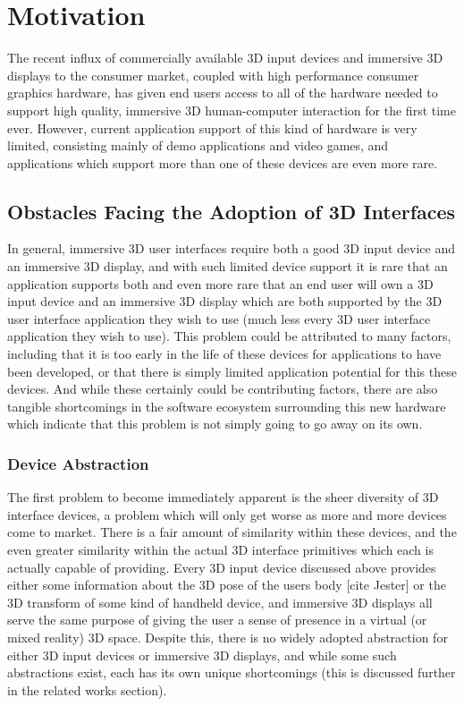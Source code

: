 \chapter{Motivation}
The recent influx of commercially available 3D input devices and immersive 3D displays to the consumer market, coupled with high performance consumer graphics hardware, has given end users access to all of the hardware needed to support high quality, immersive 3D human-computer interaction for the first time ever. However, current application support of this kind of hardware is very limited, consisting mainly of demo applications and video games, and applications which support more than one of these devices are even more rare. 

\section{Obstacles Facing the Adoption of 3D Interfaces}

In general, immersive 3D user interfaces require both a good 3D input device and an immersive 3D display, and with such limited device support it is rare that an application supports both and even more rare that an end user will own a 3D input device and an immersive 3D display which are both supported by the 3D user interface application they wish to use (much less every 3D user interface application they wish to use). This problem could be attributed to many factors, including that it is too early in the life of these devices for applications to have been developed, or that there is simply limited application potential for this these devices. And while these certainly could be contributing factors, there are also tangible shortcomings in the software ecosystem surrounding this new hardware which indicate that this problem is not simply going to go away on its own.

\subsection{Device Abstraction}

The first problem to become immediately apparent is the sheer diversity of 3D interface devices, a problem which will only get worse as more and more devices come to market. There is a fair amount of similarity within these devices, and the even greater similarity within the actual 3D interface primitives which each is actually capable of providing. Every 3D input device discussed above provides either some information about the 3D pose of the users body [cite Jester] or the 3D transform of some kind of handheld device, and immersive 3D displays all serve the same purpose of giving the user a sense of presence in a virtual (or mixed reality) 3D space. Despite this, there is no widely adopted abstraction for either 3D input devices or immersive 3D displays, and while some such abstractions exist, each has its own unique shortcomings (this is discussed further in the related works section). 


